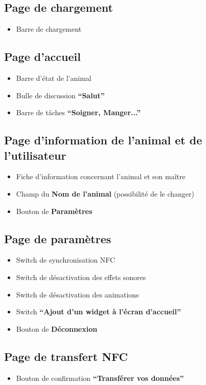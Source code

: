 \documentclass{conception_detaillee}
\begin{document}
\begin{itemize}[label=\textbullet]
\subsection{Page de chargement}
\begin{itemize}
    \item Barre de chargement
\end{itemize}

\subsection{Page d’accueil}
\begin{itemize}
    \item Barre d'état de l’animal
    \item Bulle de discussion \textbf{“Salut”}
    \item Barre de tâches \textbf{“Soigner, Manger...”}
\end{itemize}

\subsection{Page d'information de l’animal et de l'utilisateur}
\begin{itemize}
    \item Fiche d'information concernant l’animal et son maître
    \item Champ du \textbf{Nom de l’animal} (possibilité de le changer)
    \item Bouton de \textbf{Paramètres}
\end{itemize}

\subsection{Page de paramètres}
\begin{itemize}
    \item Switch de synchronisation NFC
    \item Switch de désactivation des effets sonores
    \item Switch de désactivation des animations
    \item Switch \textbf{“Ajout d’un widget à l’écran d'accueil”}
    \item Bouton de \textbf{Déconnexion}
\end{itemize}

\subsection{Page de transfert NFC}
\begin{itemize}
    \item Bouton de confirmation \textbf{“Transférer vos données”}
\end{itemize}


\end{itemize}
\end{document}
